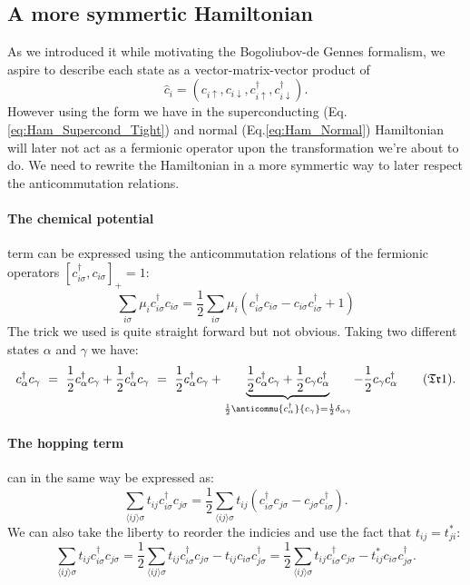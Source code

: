 \documentclass[../main.tex]{subfile}
\begin{document}
\subsection{A more symmertic Hamiltonian}
As we introduced it while motivating the Bogoliubov-de Gennes formalism, we aspire to describe each state as a vector-matrix-vector product of
\[
    \hat{c}_i = \left(c_{i\uparrow}, c_{i\downarrow},c_{i\uparrow}^{\dagger}, c_{i\downarrow}^{\dagger}\right).
\]
However using the form we have in the superconducting (Eq.\ref{eq:Ham_Supercond_Tight}) and normal (Eq.\ref{eq:Ham_Normal}) 
Hamiltonian will later not act as a fermionic operator upon the transformation we're about to
do. We need to rewrite the Hamiltonian in a more symmertic way to later respect the anticommutation relations.\\

\paragraph{The chemical potential} term can be expressed using the anticommutation relations of the fermionic operators $[c_{i\sigma}^{\dagger},c_{i\sigma}]_+ = 1$:
\begin{equation}\label{eq:SymHam_muTerm}
    \sum_{i\sigma} \mu_i c_{i\sigma}^{\dagger} c_{i\sigma} = \frac{1}{2}\sum_{i\sigma} \mu_i \left(c_{i\sigma}^{\dagger}c_{i\sigma} - c_{i\sigma}c_{i\sigma}^{\dagger} + 1\right)
\end{equation}
The trick we used is quite straight forward but not obvious. Taking two different states $\alpha$ and $\gamma$ we have:
\[
    c^{\dagger}_{\alpha}c_{\gamma} ~=~ \frac{1}{2}c^{\dagger}_{\alpha}c_{\gamma} + \frac{1}{2}c^{\dagger}_{\alpha}c_{\gamma} ~=~ \frac{1}{2}c^{\dagger}_{\alpha}c_{\gamma} + \underbrace{\frac{1}{2}c^{\dagger}_{\alpha}c_{\gamma} + \frac{1}{2}c_{\gamma}c^{\dagger}_{\alpha}}_{\frac{1}{2}\anticommu{c^{\dagger}_{\alpha}}{c_{\gamma}} = \frac{1}{2}\delta_{\alpha\gamma}} - \frac{1}{2}c_{\gamma}c^{\dagger}_{\alpha} \tag{$\mathfrak{Tr}$1}. \label{eq:Trick1}
\]
\paragraph{The hopping term} can in the same way be expressed as:
\[
    \sum_{\langle ij\rangle\sigma} t_{ij} c_{i\sigma}^{\dagger} c_{j\sigma} = \frac{1}{2}\sum_{\langle ij\rangle \sigma} t_{ij} \left(c_{i\sigma}^{\dagger}c_{j\sigma} - c_{j\sigma}c_{i\sigma}^{\dagger}\right).
\]
We can also take the liberty to reorder the indicies and use the fact that $t_{ij} = t_{ji}^{\ast}$:
\begin{equation}\label{eq:SymHam_tij}
    \sum_{\langle ij\rangle\sigma} t_{ij} c_{i\sigma}^{\dagger} c_{j\sigma} = \frac{1}{2}\sum_{\langle ij\rangle \sigma} t_{ij}c_{i\sigma}^{\dagger}c_{j\sigma} - t_{ij}c_{i\sigma}c_{j\sigma}^{\dagger} = \frac{1}{2}\sum_{\langle ij\rangle \sigma} t_{ij}c_{i\sigma}^{\dagger}c_{j\sigma} - t_{ij}^{\ast}c_{i\sigma}c_{j\sigma}^{\dagger}.
\end{equation}
\end{document}
